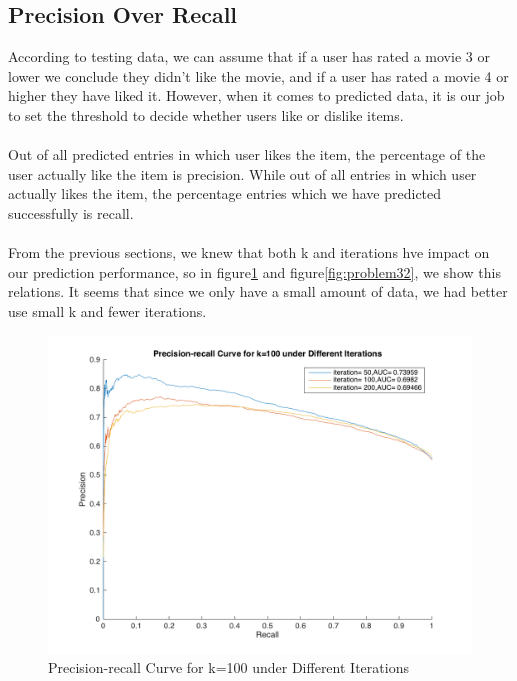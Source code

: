 \documentclass{article}
\begin{document}
\subsection{Precision Over Recall}
According to testing data, we can assume that if a user has rated a movie 3 or lower we conclude they didn't like the movie, and if a user has rated a movie 4 or higher they have liked it. However, when it comes to predicted data, it is our job to set the threshold to decide whether users like or dislike items.\\
\\
Out of all predicted entries in which user likes the item, the percentage of the user actually like the item is precision. While out of all entries in which user actually likes the item, the percentage entries which we have predicted successfully is recall.\\
\\
From the previous sections, we knew that both k and iterations hve impact on our prediction performance, so in figure\ref{fig:problem31} and figure\ref{fig:problem32}, we show this relations. It seems that since we only have a small amount of data, we had better use small k and fewer iterations.
\begin{figure}[htbp]
\centering
\includegraphics[width=\textwidth]{problem31.png}
\caption{Precision-recall Curve for k=100 under Different Iterations}
\label{fig:problem31}
\end{figure}
\end{document}
